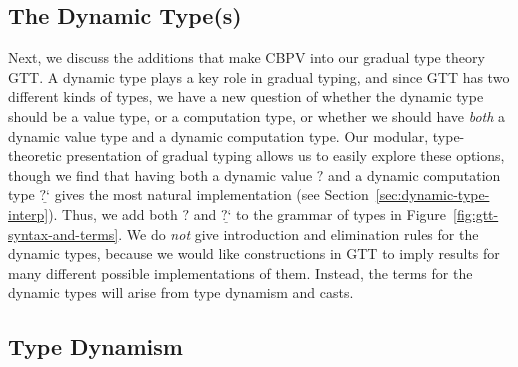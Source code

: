 \documentclass[acmsmall,nonacm]{acmart}
\newif\ifshort
\renewcommand{\u}{\underline}
\newcommand{\pipe}{\,\,|\,\,}
\newcommand{\ltdyn}{\sqsubseteq}
\newcommand{\gtdyn}{\sqsupseteq}
\newcommand{\equidyn}{\mathrel{\gtdyn\ltdyn}}
\newcommand{\dynv}{{?}}
\newcommand{\dync}{\u {\text{?`}}}
\newcommand{\err}{\mho}
\newcommand{\print}{\kw{print}}
\newcommand{\kw}[1]{\texttt{#1}\,\,}
\begin{document}

\ifshort \vspace{-0.1in} \fi
\subsection{The Dynamic Type(s)}

Next, we discuss the additions that make CBPV into our gradual type
theory GTT.  A dynamic type plays a key role in gradual typing, and
since GTT has two different kinds of types, we have a new question of
whether the dynamic type should be a value type, or a computation type,
or whether we should have \emph{both} a dynamic value type and a dynamic
computation type.
%
Our modular, type-theoretic presentation of gradual typing allows us to
easily explore these options, though we find that having
both a dynamic value $\dynv$ and a dynamic computation type $\dync$
gives the most natural implementation (see
Section~\ref{sec:dynamic-type-interp}).  Thus, we add both $\dynv$ and
$\dync$ to the grammar of types in
Figure~\ref{fig:gtt-syntax-and-terms}.  We do \emph{not} give
introduction and elimination rules for the dynamic types, because we
would like constructions in GTT to imply results for many different
possible implementations of them.  Instead, the terms for the dynamic
types will arise from type dynamism and casts.

\ifshort \vspace{-0.12in} \fi
\subsection{Type Dynamism}
\end{document}
